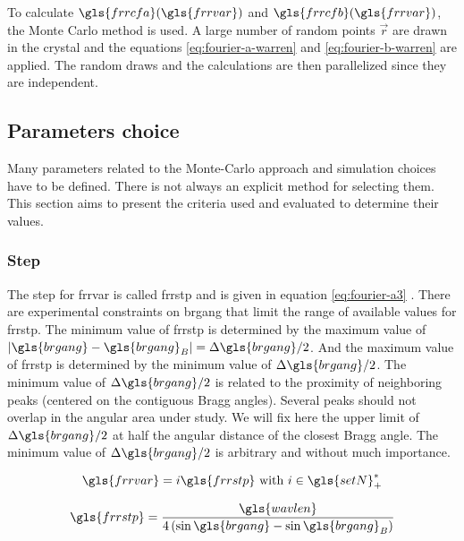 To calculate \( \gls{frrcfa}(\gls{frrvar}) \) and \( \gls{frrcfb}(\gls{frrvar}) \), the Monte Carlo method is used.
A large number of random points \( \vec{r} \) are drawn in the crystal and the equations \eqref{eq:fourier-a-warren} and \eqref{eq:fourier-b-warren} are applied. The random draws and the calculations are then parallelized since they are independent.

\subsection{Parameters choice}

Many parameters related to the Monte-Carlo approach and simulation choices have to be defined.
There is not always an explicit method for selecting them.
This section aims to present the criteria used and evaluated to determine their values.

\subsubsection{Step}

The step for \gls{frrvar} is called \gls{frrstp} and is given in equation \eqref{eq:fourier-a3} \cite{W1990}.
There are experimental constraints on \gls{brgang} that limit the range of available values for \gls{frrstp}.
The minimum value of \gls{frrstp} is determined by the maximum value of \( | \gls{brgang} - \gls{brgang}_B | = \Delta \gls{brgang} / 2 \).
And the maximum value of \gls{frrstp} is determined by the minimum value of \( \Delta \gls{brgang} / 2 \).
The minimum value of \( \Delta \gls{brgang} / 2 \) is related to the proximity of neighboring peaks (centered on the contiguous Bragg angles).
Several peaks should not overlap in the angular area under study.
We will fix here the upper limit of \( \Delta \gls{brgang} / 2 \) at half the angular distance of the closest Bragg angle.
The minimum value of \( \Delta \gls{brgang} / 2 \) is arbitrary and without much importance.

\begin{equation}\label{eq:fourier-L-step}
\gls{frrvar} = i \gls{frrstp} \ \text{with} \ i \in \gls{setN}^*_+
\end{equation}

\begin{equation}\label{eq:fourier-a3}
\gls{frrstp} = \frac{\gls{wavlen}}{4 \left( \sin \gls{brgang} - \sin \gls{brgang}_B \right)}
\end{equation}

\medskip


